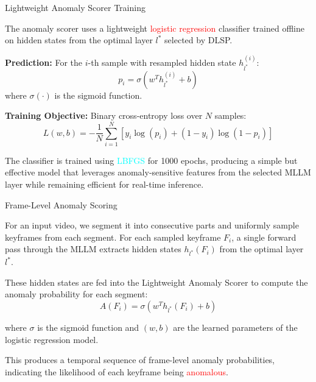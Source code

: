 \documentclass[aspectratio=169,xcolor=dvipsnames]{beamer}
\begin{document}
	
	\begin{frame}{Lightweight Anomaly Scorer Training}
		\small
		
		The anomaly scorer uses a lightweight \textcolor{red}{logistic regression} classifier trained offline
		on hidden states from the optimal layer $l^{*}$ selected by DLSP.
		
		\vspace{0.8em}
		
		\textbf{Prediction:}  
		For the $i$-th sample with resampled hidden state $h^{(i)}_{l^{*}}$:
		\[
		p_i = \sigma\left(w^{T} h^{(i)}_{l^{*}} + b\right)
		\]
		where $\sigma(\cdot)$ is the sigmoid function.
		
		\vspace{0.8em}
		
		\textbf{Training Objective:}  
		Binary cross-entropy loss over $N$ samples:
		\[
		L(w, b) = -\frac{1}{N}\sum_{i=1}^{N}
		\left[
		y_i \log(p_i) +
		(1 - y_i) \log(1 - p_i)
		\right]
		\]
		
		\vspace{0.8em}
		
		The classifier is trained using \textcolor{cyan}{LBFGS} for 1000 epochs, producing a simple but
		effective model that leverages anomaly-sensitive features from the
		selected MLLM layer while remaining efficient for real-time inference.
		
	\end{frame}
	
	
	\begin{frame}{Frame-Level Anomaly Scoring}
		\small
		
		For an input video, we segment it into consecutive parts and
		uniformly sample keyframes from each segment. For each sampled
		keyframe $F_i$, a single forward pass through the MLLM extracts
		hidden states $h_{l^{*}}(F_i)$ from the optimal layer $l^{*}$.
		
		\vspace{0.8em}
		
		These hidden states are fed into the Lightweight Anomaly Scorer
		to compute the anomaly probability for each segment:
		\[
		A(F_i) = \sigma\!\left(w^{T} h_{l^{*}}(F_i) + b\right)
		\]
		
		where $\sigma$ is the sigmoid function and $(w, b)$ are the learned
		parameters of the logistic regression model.
		
		\vspace{0.8em}
		
		This produces a temporal sequence of frame-level anomaly
		probabilities, indicating the likelihood of each keyframe being
		\textcolor{red}{anomalous}.
		
	\end{frame}
	
\end{document}
